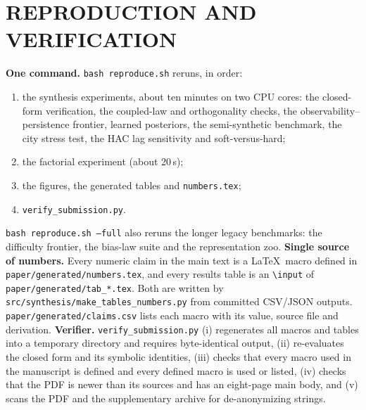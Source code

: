 \section{REPRODUCTION AND VERIFICATION}
\label{app:repro}
\textbf{One command.} \texttt{bash reproduce.sh} reruns, in order:
\begin{enumerate}
\item the synthesis experiments, about ten minutes on two CPU cores: the closed-form verification, the coupled-law and orthogonality checks, the observability--persistence frontier, learned posteriors, the semi-synthetic benchmark, the city stress test, the HAC lag sensitivity and soft-versus-hard;
\item the factorial experiment (about 20\,s);
\item the figures, the generated tables and \texttt{numbers.tex};
\item \texttt{verify\_submission.py}.
\end{enumerate}
\texttt{bash reproduce.sh --full} also reruns the longer legacy benchmarks: the difficulty frontier, the bias-law suite and the representation zoo.
\textbf{Single source of numbers.} Every numeric claim in the main text is a \LaTeX\ macro defined in \texttt{paper/generated/numbers.tex}, and every results table is an \texttt{\textbackslash input} of \texttt{paper/generated/tab\_*.tex}. Both are written by \texttt{src/synthesis/make\_tables\_numbers.py} from committed CSV/JSON outputs. \texttt{paper/generated/claims.csv} lists each macro with its value, source file and derivation.
\textbf{Verifier.} \texttt{verify\_submission.py} (i) regenerates all macros and tables into a temporary directory and requires byte-identical output, (ii) re-evaluates the closed form and its symbolic identities, (iii) checks that every macro used in the manuscript is defined and every defined macro is used or listed, (iv) checks that the PDF is newer than its sources and has an eight-page main body, and (v) scans the PDF and the supplementary archive for de-anonymizing strings.

